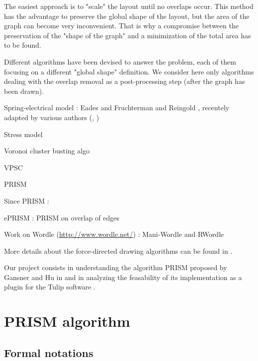 \documentclass[12pt]{report}
\begin{document}
The easiest approach is to "scale" the layout until no overlaps occur. This method has the advantage to preserve the global shape of the layout, but the area of the graph can become very inconvenient. That is why a compromise between the preservation of the "shape of the graph" and a minimization of the total area has to be found.

\bigskip
Different algorithms have been devised to answer the problem, each of them focusing on a different "global shape" definition. We consider here only algorithms dealing with the overlap removal as a post-processing step (after the graph has been drawn).

Spring-electrical model : Eades \cite{Eades84} and Fruchterman and Reingold \cite{FR91}, recentely adapted by various authors (\cite{HK02}, \cite{Li05})

Stress model \cite{Kamada89}

Voronoi cluster busting algo \cite{Gansner98}

VPSC \cite{VPSC06}

PRISM \cite{Gansner08}

\bigskip
Since PRISM : 

ePRISM : PRISM on overlap of edges \cite{Hu09}

Work on Wordle (\url{http://www.wordle.net/}) : Mani-Wordle \cite{Koh10} and RWordle \cite{SSSK12}

More details about the force-directed drawing algorithms can be found in \cite{Kob13}.

\bigskip
Our project consists in understanding the algorithm PRISM proposed by Gansner and Hu in \cite{Gansner08} and in analyzing the feasability of its implementation as a plugin for the Tulip software \cite{Auber12}.




\chapter{PRISM algorithm}

\section{Formal notations}

\end{document}
